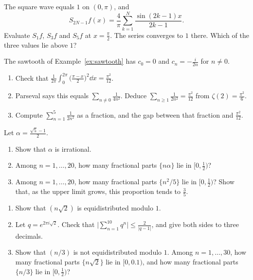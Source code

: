 \begin{exercise}[$\star$]\label{ex:rw06a}
The square wave equals $1$ on $(0,\pi)$, and
\[
S_{2N-1}f(x)=\frac4\pi\sum_{k=1}^N\frac{\sin(2k-1)x}{2k-1}.
\]
Evaluate $S_1f$, $S_3f$ and $S_5f$ at $x=\frac\pi2$. The series converges to $1$ there. Which of the three values lie above $1$?
\end{exercise}

\begin{exercise}[$\star\star$]\label{ex:rw06b}
The sawtooth of Example~\ref{ex:sawtooth} has $c_0=0$ and $c_n=-\frac i{2n}$ for $n\ne0$.
\begin{enumerate}[label=(\alph*)]
\item Check that $\frac1{2\pi}\int_0^{2\pi}\bigl(\frac{\pi-x}2\bigr)^2\dd x=\frac{\pi^2}{12}$.
\item Parseval says this equals $\sum_{n\ne0}\frac1{4n^2}$. Deduce $\sum_{n\ge1}\frac1{2n^2}=\frac{\pi^2}{12}$ from $\zeta(2)=\frac{\pi^2}6$.
\item Compute $\sum_{n=1}^5\frac1{2n^2}$ as a fraction, and the gap between that fraction and $\frac{\pi^2}{12}$.
\end{enumerate}
\end{exercise}

\begin{exercise}[$\star\star$]\label{ex:rw06c}
Let $\alpha=\frac{\sqrt5-1}2$.
\begin{enumerate}[label=(\alph*)]
\item Show that $\alpha$ is irrational.
\item Among $n=1,\ldots,20$, how many fractional parts $\{n\alpha\}$ lie in $\bigl[0,\frac12\bigr)$?
\item Among $n=1,\ldots,20$, how many fractional parts $\{n^2/5\}$ lie in $\bigl[0,\frac12\bigr)$? Show that, as the upper limit grows, this proportion tends to $\frac35$.
\end{enumerate}
\end{exercise}

\begin{exercise}[$\star\star\star$]\label{ex:rw06d}
\begin{enumerate}[label=(\alph*)]
\item Show that $(n\sqrt2)$ is equidistributed modulo $1$.
\item Let $q=e^{2\pi i\sqrt2}$. Check that $\bigl|\sum_{n=1}^{10}q^n\bigr|\le\frac2{|q-1|}$, and give both sides to three decimals.
\item Show that $(n/3)$ is not equidistributed modulo $1$. Among $n=1,\ldots,30$, how many fractional parts $\{n\sqrt2\}$ lie in $[0,0.1)$, and how many fractional parts $\{n/3\}$ lie in $\bigl[0,\frac12\bigr)$?
\end{enumerate}
\end{exercise}

